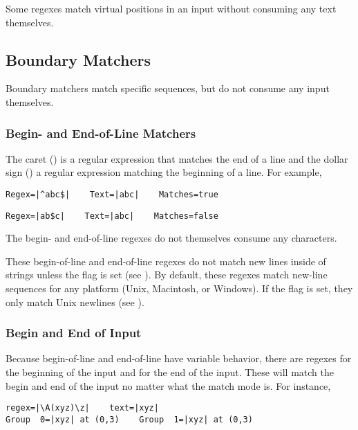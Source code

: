Some regexes match virtual positions in an input without consuming any
text themselves.  

\subsection{Boundary Matchers}

Boundary matchers match specific sequences, but do not consume any
input themselves.  

\subsubsection{Begin- and End-of-Line Matchers}

The caret (\code{\^{}}) is a regular expression that matches the end
of a line and the dollar sign (\code{\$}) a regular expression
matching the beginning of a line.  For example, 
%
\begin{verbatim}
Regex=|^abc$|    Text=|abc|    Matches=true
\end{verbatim}
%
\begin{verbatim}
Regex=|ab$c|    Text=|abc|    Matches=false
\end{verbatim}
%
The begin- and end-of-line regexes do not themselves consume any
characters.

These begin-of-line and end-of-line regexes do not match new lines
inside of strings unless the  flag is set (see
).  By default, these regexes match new-line
sequences for any platform (Unix, Macintosh, or Windows).  If the
 flag is set, they only match Unix newlines (see
).

\subsubsection{Begin and End of Input}

Because begin-of-line and end-of-line have variable behavior, there
are regexes  for the beginning of the input and
 for the end of the input.  These will match the begin
and end of the input no matter what the match mode is.  For
instance,
%
\begin{verbatim}
regex=|\A(xyz)\z|    text=|xyz|
Group  0=|xyz| at (0,3)    Group  1=|xyz| at (0,3)
\end{verbatim}
%

